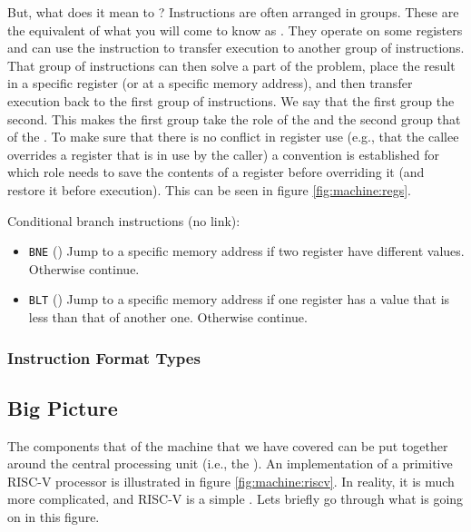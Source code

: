 But, what does it mean to ? Instructions are often arranged in groups. These are the equivalent of what you will come to know as . They operate on some registers and can use the  instruction to transfer execution to another group of instructions. That group of instructions can then solve a part of the problem, place the result in a specific register (or at a specific memory address), and then transfer execution back to the first group of instructions. We say that the first group  the second. This makes the first group take the role of the  and the second group that of the . To make sure that there is no conflict in register use (e.g., that the callee overrides a register that is in use by the caller) a convention is established for which role needs to save the contents of a register before overriding it (and restore it before  execution). This can be seen in figure \ref{fig:machine:regs}.

Conditional branch instructions (no link):
\begin{itemize}
  \item \texttt{BNE} () Jump to a specific memory address if two register have different values. Otherwise continue.
  \item \texttt{BLT} () Jump to a specific memory address if one register has a value that is less than that of another one. Otherwise continue.
\end{itemize}

\subsubsection{Instruction Format Types}


\subsection{Big Picture}

The components that of the machine that we have covered can be put together around the central processing unit (i.e., the ). An implementation of a primitive RISC-V processor is illustrated in figure \ref{fig:machine:riscv}. In reality, it is much more complicated, and RISC-V is a simple . Lets briefly go through what is going on in this figure.

